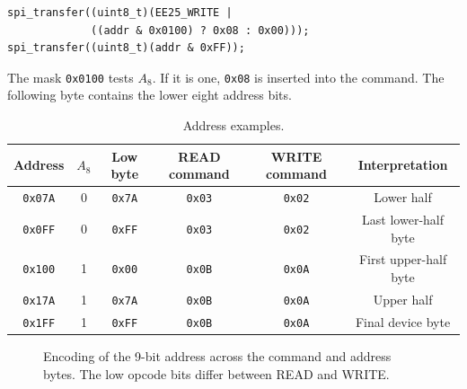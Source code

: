 \documentclass[11pt,a4paper]{article}
\begin{document}
\begin{lstlisting}[style=cstyle]
spi_transfer((uint8_t)(EE25_WRITE |
             ((addr & 0x0100) ? 0x08 : 0x00)));
spi_transfer((uint8_t)(addr & 0xFF));
\end{lstlisting}

The mask \texttt{0x0100} tests $A_8$. If it is one, \texttt{0x08} is inserted into the command. The following byte contains the lower eight address bits.

\begin{table}[H]
\centering
\caption{Address examples.}
\begin{tabular}{cccccc}
\toprule
Address & $A_8$ & Low byte & READ command & WRITE command & Interpretation \\
\midrule
\texttt{0x07A} & 0 & \texttt{0x7A} & \texttt{0x03} & \texttt{0x02} & Lower half \\
\texttt{0x0FF} & 0 & \texttt{0xFF} & \texttt{0x03} & \texttt{0x02} & Last lower-half byte \\
\texttt{0x100} & 1 & \texttt{0x00} & \texttt{0x0B} & \texttt{0x0A} & First upper-half byte \\
\texttt{0x17A} & 1 & \texttt{0x7A} & \texttt{0x0B} & \texttt{0x0A} & Upper half \\
\texttt{0x1FF} & 1 & \texttt{0xFF} & \texttt{0x0B} & \texttt{0x0A} & Final device byte \\
\bottomrule
\end{tabular}
\end{table}

\begin{figure}[H]
\centering
{}
\caption{Encoding of the 9-bit address across the command and address bytes. The low opcode bits differ between READ and WRITE.}
\end{figure}
\end{document}
